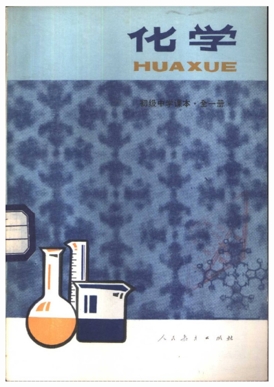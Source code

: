 \begin{titlepage}
    \begin{figure}[htbp]
        \centering
        \includegraphics[width=0.9\textwidth]{../pic/czhx1-cover-1}
    \end{figure}

    \newpage


\end{titlepage}
